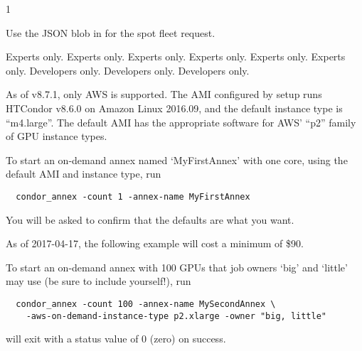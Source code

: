 \begin{ManPage}{\label{man-condor-annex}}{1}
\begin{Options}
		{Use the JSON blob in  for the spot fleet request.}

	 {Experts only.}
	 {Experts only.}
	 {Experts only.}
	 {Experts only.}
	 {Experts only.}
	 {Experts only.}
	 {Developers only.}
	 {Developers only.}
	 {Developers only.}
\end{Options}

\GenRem

As of v8.7.1, only AWS is supported.  The AMI configured by setup runs
HTCondor v8.6.0 on Amazon Linux 2016.09, and the default instance type
is ``m4.large''.  The default AMI has the appropriate software for AWS'
``p2'' family of GPU instance types.

\Examples

To start an on-demand annex named `MyFirstAnnex' with one core,
using the default AMI and instance type, run

\begin{verbatim}
  condor_annex -count 1 -annex-name MyFirstAnnex
\end{verbatim}

You will be asked to confirm that the defaults are what you want.

As of 2017-04-17, the following example will cost a minimum of \$90.

To start an on-demand annex with 100 GPUs that job owners `big' and `little'
may use (be sure to include yourself!), run

\begin{verbatim}
  condor_annex -count 100 -annex-name MySecondAnnex \
    -aws-on-demand-instance-type p2.xlarge -owner "big, little"
\end{verbatim}

\ExitStatus

 will exit with a status value of 0 (zero) on success.

\end{ManPage}
